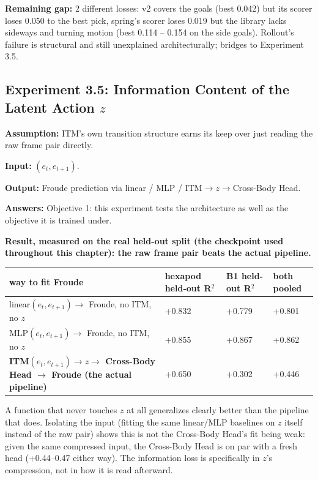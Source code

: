 \documentclass[12pt,a4paper,oneside]{report}
\begin{document}
\textbf{Remaining gap:} 2 different losses: v2 covers the goals (best 0.042) but its scorer loses 0.050 to the best pick, spring's scorer loses 0.019 but the library lacks sideways and turning motion (best 0.114 -- 0.154 on the side goals). Rollout's failure is structural and still unexplained architecturally; bridges to Experiment 3.5.

\subsection{Experiment 3.5: Information Content of the Latent Action $z$}


\textbf{Assumption:} ITM's own transition structure earns its keep over just reading the raw frame pair directly.


\textbf{Input:} $(e_t, e_{t+1})$.

\textbf{Output:} Froude prediction via linear / MLP / $\mathrm{ITM}\to z\to$Cross-Body Head.


\textbf{Answers:} Objective 1: this experiment tests the architecture as well as the objective it is trained under.


\textbf{Result, measured on the real held-out split (the checkpoint used throughout this chapter): the raw frame pair beats the actual pipeline.}


\begin{center}
\footnotesize
\setlength{\tabcolsep}{3pt}
\begin{tabularx}{\textwidth}{>{\hsize}Y>{\hsize\centering\arraybackslash}Y>{\hsize\centering\arraybackslash}Y>{\hsize\centering\arraybackslash}Y}
\toprule
\textbf{way to fit Froude} & \textbf{hexapod held-out R$^2$} & \textbf{B1 held-out R$^2$} & \textbf{both pooled} \\
\midrule
linear$(e_t, e_{t+1}) \to$ Froude, no ITM, no $z$ & +0.832 & +0.779 & +0.801 \\
\addlinespace[3pt]
MLP$(e_t, e_{t+1}) \to$ Froude, no ITM, no $z$ & +0.855 & +0.867 & +0.862 \\
\addlinespace[3pt]
\textbf{ITM$(e_t, e_{t+1}) \to z \to$ Cross-Body Head $\to$ Froude (the actual pipeline)} & +0.650 & +0.302 & +0.446 \\
\bottomrule
\end{tabularx}
\end{center}

A function that never touches $z$ at all generalizes clearly better than the pipeline that does. Isolating the input (fitting the same linear/MLP baselines on $z$ itself instead of the raw pair) shows this is not the Cross-Body Head's fit being weak: given the same compressed input, the Cross-Body Head is on par with a fresh head (+0.44--0.47 either way). The information loss is specifically in $z$'s compression, not in how it is read afterward.
\end{document}
